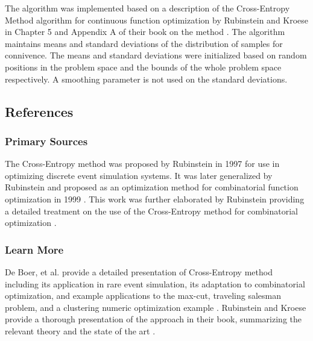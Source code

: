 The algorithm was implemented based on a description of the Cross-Entropy Method algorithm for continuous function optimization by Rubinstein and Kroese in Chapter 5 and Appendix A of their book on the method \cite{Rubinstein2004}. The algorithm maintains means and standard deviations  of the distribution of samples for connivence. The means and standard deviations were initialized based on random positions in the problem space and the bounds of the whole problem space respectively. A smoothing parameter is not used on the standard deviations.



\subsection{References}

% 
% 
\subsubsection{Primary Sources}
The Cross-Entropy method was proposed by Rubinstein in 1997 \cite{Rubinstein1997} for use in optimizing discrete event simulation systems. It was later generalized by Rubinstein and proposed as an optimization method for combinatorial function optimization in 1999 \cite{Rubinstein1999}.
This work was further elaborated by Rubinstein providing a detailed treatment on the use of the Cross-Entropy method for combinatorial optimization \cite{Rubinstein2001}.



% 
% 
\subsubsection{Learn More}
De Boer, et al. provide a detailed presentation of Cross-Entropy method including its application in rare event simulation, its adaptation to combinatorial optimization, and example applications to the max-cut, traveling salesman problem, and a clustering numeric optimization example \cite{DeBoer2005}.
Rubinstein and Kroese provide a thorough presentation of the approach in their book, summarizing the relevant theory and the state of the art \cite{Rubinstein2004}.


